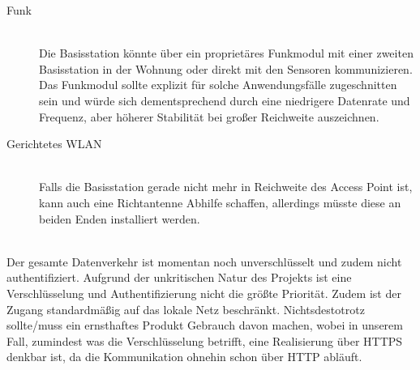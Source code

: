 \begin{description}
		\begin{description}
			\item [Funk]  \hfill \\
				Die Basisstation könnte über ein proprietäres Funkmodul mit einer zweiten Basisstation in der Wohnung oder direkt mit den Sensoren kommunizieren. Das Funkmodul sollte explizit für solche Anwendungsfälle zugeschnitten sein und würde sich dementsprechend durch eine niedrigere Datenrate und Frequenz, aber höherer Stabilität bei großer Reichweite auszeichnen. 
			\item [Gerichtetes WLAN] \hfill \\
				Falls die Basisstation gerade nicht mehr in Reichweite des Access Point ist, kann auch eine Richtantenne Abhilfe schaffen, allerdings müsste diese an beiden Enden installiert werden.
		\end{description}
	\item [Verschlüsselung] \hfill \\
		Der gesamte Datenverkehr ist momentan noch unverschlüsselt und zudem nicht authentifiziert. Aufgrund der unkritischen Natur des Projekts ist eine Verschlüsselung und Authentifizierung nicht die größte Priorität. Zudem ist der Zugang standardmäßig auf das lokale Netz beschränkt. Nichtsdestotrotz sollte/muss ein ernsthaftes Produkt Gebrauch davon machen, wobei in unserem Fall, zumindest was die Verschlüsselung betrifft, eine Realisierung über HTTPS denkbar ist, da die Kommunikation ohnehin schon über HTTP abläuft.
	\item
\end{description}
